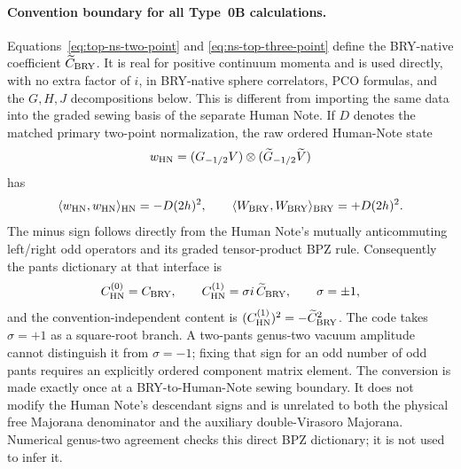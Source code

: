 \documentclass[11pt]{article}
\begin{document}
\paragraph{Convention boundary for all Type~0B calculations.}
Equations~\eqref{eq:top-ns-two-point} and
\eqref{eq:ns-top-three-point} define the BRY-native coefficient
$\widetilde C_{\rm BRY}$.  It is real for positive continuum momenta and is
used directly, with no extra factor of $i$, in BRY-native sphere correlators,
PCO formulas, and the $G,H,J$ decompositions below.  This is different from
importing the same data into the graded sewing basis of the separate Human
Note.  If $D$ denotes the matched primary two-point normalization, the raw
ordered Human-Note state
\begin{equation}
 w_{\rm HN}=(G_{-1/2}V)\otimes
 (\widetilde G_{-1/2}\widetilde V)
 \label{eq:hn-raw-top-state}
\end{equation}
has
\begin{equation}
 \langle w_{\rm HN},w_{\rm HN}\rangle_{\rm HN}
 =-D(2h)^2,
 \qquad
 \langle W_{\rm BRY},W_{\rm BRY}\rangle_{\rm BRY}
 =+D(2h)^2.
 \label{eq:bry-hn-top-bpz-comparison}
\end{equation}
The minus sign follows directly from the Human Note's mutually
anticommuting left/right odd operators and its graded tensor-product BPZ
rule.  Consequently the pants dictionary at that interface is
\begin{equation}
 C_{\rm HN}^{(0)}=C_{\rm BRY},\qquad
 C_{\rm HN}^{(1)}=\sigma i\,\widetilde C_{\rm BRY},
 \qquad \sigma=\pm1,
 \label{eq:bry-hn-pants-dictionary}
\end{equation}
and the convention-independent content is
$(C_{\rm HN}^{(1)})^2=-\widetilde C_{\rm BRY}^{2}$.  The code takes
$\sigma=+1$ as a square-root branch.  A two-pants genus-two vacuum amplitude
cannot distinguish it from $\sigma=-1$; fixing that sign for an odd number
of odd pants requires an explicitly ordered component matrix element.  The
conversion is made exactly once at a BRY-to-Human-Note sewing boundary.  It
does not modify the Human Note's descendant signs and is unrelated to both
the physical free Majorana denominator and the auxiliary double-Virasoro
Majorana.  Numerical genus-two agreement checks this direct BPZ dictionary;
it is not used to infer it.
\end{document}
